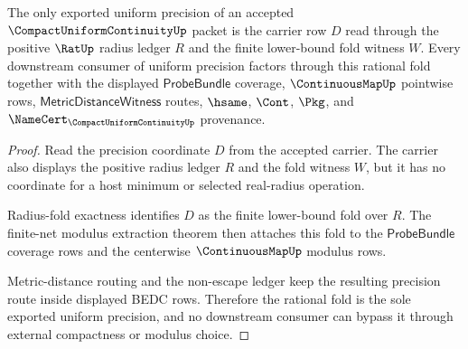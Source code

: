 \begin{theorem}
\label{thm:compact-uniform-continuity-rational-fold-export}
The only exported uniform precision of an accepted $\CompactUniformContinuityUp$ packet is the carrier row $D$ read through the positive $\RatUp$ radius ledger $R$ and the finite lower-bound fold witness $W$. Every downstream consumer of uniform precision factors through this rational fold together with the displayed $\mathsf{ProbeBundle}$ coverage, $\ContinuousMapUp$ pointwise rows, $\mathsf{MetricDistanceWitness}$ routes, $\hsame$, $\Cont$, $\Pkg$, and $\NameCert_{\CompactUniformContinuityUp}$ provenance.
\end{theorem}
\begin{proof}
Read the precision coordinate $D$ from the accepted carrier. The carrier also displays the positive radius ledger $R$ and the fold witness $W$, but it has no coordinate for a host minimum or selected real-radius operation.

Radius-fold exactness identifies $D$ as the finite lower-bound fold over $R$. The finite-net modulus extraction theorem then attaches this fold to the $\mathsf{ProbeBundle}$ coverage rows and the centerwise $\ContinuousMapUp$ modulus rows.

Metric-distance routing and the non-escape ledger keep the resulting precision route inside displayed BEDC rows. Therefore the rational fold is the sole exported uniform precision, and no downstream consumer can bypass it through external compactness or modulus choice.
\end{proof}
